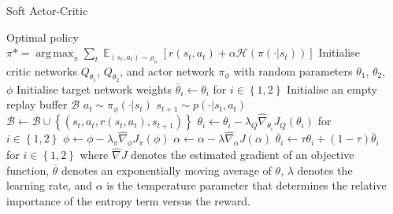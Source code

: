\begin{frame}[fragile]
\begin{columns}[T]
\begin{column}{.46\textwidth}
\begin{block}{Soft Actor-Critic}
\begin{scriptsize}
\begin{algorithmic}
\State Optimal policy $\pi\mbox{*} = \operatorname*{\mathrm{arg\,max}}_\pi \sum_t \mathop{\mathbb{E}}_{(s_t,a_t)\sim\rho_\pi}\left[r(s_t,a_t)+\alpha\mathcal{H}(\pi(\cdot|s_t))\right]$
\State Initialise critic networks $Q_{\theta_1}$, $Q_{\theta_2}$, and actor network $\pi_\phi$ with random parameters $\theta_1$, $\theta_2$, $\phi$
\State Initialise target network weights $\overline{\theta}_i \gets \theta_i$  for $i \in \left\{1,2\right\}$
\State Initialise an empty replay buffer $\mathcal{B}$
        \State $a_t \sim \pi_\phi(\cdot|s_t)$
        \State $s_{t+1} \sim p(\cdot|s_t,a_t)$
        \State $\mathcal{B} \gets \mathcal{B} \cup \left\{(s_t,a_t,r(s_t,a_t),s_{t+1})\right\}$
    \EndFor
        \State $\theta_i \gets \theta_i - \lambda_Q\hat\nabla_{\theta_i}J_Q(\theta_i)$ for $i \in \left\{1,2\right\}$
        \State $\phi \gets \phi - \lambda_\pi\hat\nabla_{\phi}J_\pi(\phi)$
        \State $\alpha \gets \alpha - \lambda\hat\nabla_{\alpha}J(\alpha)$
        \State $\overline{\theta}_i \gets \tau\theta_i + (1-\tau)\overline{\theta}_i$ for $i \in \left\{1,2\right\}$
    \EndFor
\EndFor
\State where $\hat\nabla J$ denotes the estimated gradient of an objective function, $\overline{\theta}$ denotes an exponentially moving average of $\theta$, $\lambda$ denotes the learning rate, and $\alpha$ is the temperature parameter that determines the relative importance of the entropy term versus the reward.
\end{algorithmic}
\end{scriptsize}
\end{block}

\end{column}



\begin{column}{.46\textwidth}


\end{column}
\end{columns}
\end{frame}
